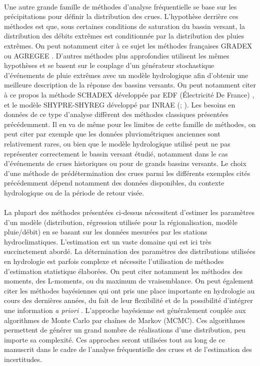 	\paragraph{} Une autre grande famille de méthodes d'analyse fréquentielle se base sur les précipitations pour définir la distribution des crues. L'hypothèse derrière ces méthodes est que, sous certaines conditions de saturation du bassin versant, la distribution des débits extrêmes est conditionnée par la distribution des pluies extrêmes. On peut notamment citer à ce sujet les méthodes françaises GRADEX \citep{guillot_methode_1967} ou AGREGEE \citep{margoum_estimation_1994}. D'autres méthodes plus approfondies utilisent les mêmes hypothèses et se basent sur le couplage d'un générateur stochastique d'événements de pluie extrêmes avec un modèle hydrologique afin d'obtenir une meilleure description de la réponse des bassins versants. On peut notamment citer à ce propos la méthode SCHADEX développée par EDF (Électricité De France) \citep{paquet_schadex_2013}, et le modèle SHYPRE-SHYREG développé par INRAE (\cite{arnaud_coupled_2002}; \cite{aubert_methode_2014}). Les besoins en données de ce type d'analyse diffèrent des méthodes classiques présentées précédemment. Il en va de même pour les limites de cette famille de méthodes, on peut citer par exemple que les données pluviométriques anciennes sont relativement rares, ou bien que le modèle hydrologique utilisé peut ne pas représenter correctement le bassin versant étudié, notamment dans le cas d'événements de crues historiques ou pour de grands bassins versants. Le choix d'une méthode de prédétermination des crues parmi les différents exemples cités précédemment dépend notamment des données disponibles, du contexte hydrologique ou de la période de retour visée.
		
	\paragraph{} La plupart des méthodes présentées ci-dessus nécessitent d'estimer les paramètres d'un modèle (distribution, régression utilisée pour la régionalisation, modèle pluie/débit) en se basant sur les données mesurées par les stations hydroclimatiques. L'estimation est un vaste domaine qui est ici très succinctement abordé. La détermination des paramètres des distributions utilisées en hydrologie est parfois complexe et nécessite l'utilisation de méthodes d'estimation statistique élaborées. On peut citer notamment les méthodes des moments, des L-moments, ou du maximum de vraisemblance. On peut également citer les méthodes bayésiennes qui ont pris une place importante en hydrologie au cours des dernières années, du fait de leur flexibilité et de la possibilité d'intégrer une information \textit{a priori} \citep{renard_bayesian_2013}. L'approche bayésienne est généralement couplée aux algorithmes de Monte Carlo par chaînes de Markov (MCMC). Ces algorithmes permettent de générer un grand nombre de réalisations d'une distribution, peu importe sa complexité. Ces approches seront utilisées tout au long de ce manuscrit dans le cadre de l'analyse fréquentielle des crues et de l'estimation des incertitudes. 	
		
